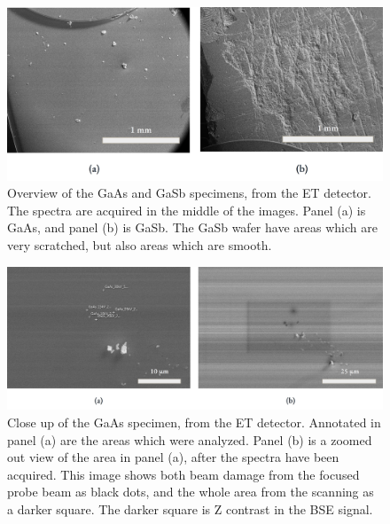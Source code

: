 \begin{figure}[phtb]
    \centering
    \includegraphics[width=.99\textwidth]{figures/SE_images/Overview_GaAs_GaSb.jpg}
    \caption{
        Overview of the GaAs and GaSb specimens, from the ET detector.
        The spectra are acquired in the middle of the images.
        Panel (a) is GaAs, and panel (b) is GaSb.
        The GaSb wafer have areas which are very scratched, but also areas which are smooth.
    }
    \label{fig:SE_images:Overview_GaAs_GaSb}
\end{figure}

\begin{figure}[phtb]
    \centering
    \includegraphics[width=.99\textwidth]{figures/SE_images/GaAs_close.jpg}
    \caption{
        Close up of the GaAs specimen, from the ET detector.
        Annotated in panel (a) are the areas which were analyzed.
        Panel (b) is a zoomed out view of the area in panel (a), after the spectra have been acquired.
        This image shows both beam damage from the focused probe beam as black dots, and the whole area from the scanning as a darker square.
        The darker square is Z contrast in the BSE signal.
    }
    \label{fig:SE_images:GaAs}
\end{figure}


